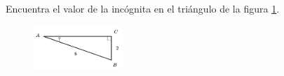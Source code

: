 \question[15]  Encuentra el valor de la incógnita en el triángulo de la figura \ref{fig:angle_functrig_01}.
\begin{figure}[H]
    \begin{center}
        \includegraphics[width=0.3\textwidth]{../images/angle_functrig_01.png}
    \end{center}
    \caption{}
    \label{fig:angle_functrig_01}
\end{figure}